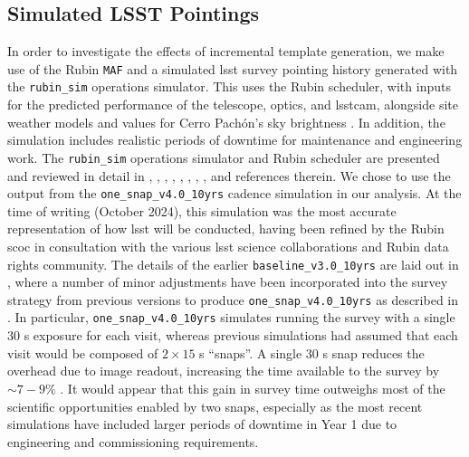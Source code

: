 \documentclass[preprintm,linenumbers]{aastex631}
\newcommand{\baselinefull}{\texttt{one\_snap\_v4.0\_10yrs}\xspace}
\newcommand{\rubinsim}{\texttt{rubin\_sim}\xspace}
\newcommand{\maf}{\texttt{MAF}\xspace}
\begin{document}
	\subsection{Simulated LSST Pointings}
	In order to investigate the effects of incremental template generation, we make use of the Rubin \maf \citep{2014SPIE.9149E..0BJ} and a simulated \gls*{lsst} survey pointing history generated with the \rubinsim operations simulator.
 This uses the Rubin scheduler, with inputs for the predicted performance of the telescope, optics, and \gls*{lsstcam}, alongside site weather models %
 and values for Cerro Pach{\'o}n's sky brightness \citep{Yoachim2016}.
 In addition, the simulation includes realistic periods of downtime for maintenance and engineering work. 
 The \rubinsim operations simulator and Rubin scheduler are presented and reviewed in detail in \cite{2014SPIE.9150E..14C}, \cite{2014SPIE.9150E..15D}, \cite{2016SPIE.9910E..13D}, \cite{Yoachim2016},  \cite{lsstsciencecollaborationScienceDrivenOptimizationLSST2017},  \cite{2018Icar..303..181J}, \cite{2019AJ....157..151N}, \cite{jones_r_lynne_2020_4048838}, \cite{2022ApJS..258....1B} and references therein.  
 We chose to use the output from the \baselinefull cadence simulation \citep{v4.0sims} in our analysis. At the time of writing (October 2024), this simulation was the most accurate representation of how \gls*{lsst} will be conducted, having been refined by the Rubin \gls*{scoc} in consultation with the various \gls*{lsst} science collaborations and Rubin data rights community. 
	The details of the earlier \texttt{baseline\_v3.0\_10yrs} are laid out in \cite{SCOC_Report_2}, where a number of minor adjustments have been incorporated into the survey strategy from previous versions to produce \baselinefull as described in \cite{SCOC_Report_3}. 
    In particular, \baselinefull simulates running the survey with a single $30$ s exposure for each visit, whereas previous simulations had assumed that each visit would be composed of $2 \times 15$ s ``snaps''.
    A single $30$ s snap reduces the overhead due to image readout, increasing the time available to the survey by $\sim 7-9 \%$ \citep[see Section 3.6 of][]{SCOC_Report_3}.
    It would appear that this gain in survey time outweighs most of the scientific opportunities enabled by two snaps, especially as the most recent simulations have included larger periods of downtime in Year 1 due to engineering and commissioning requirements.
	
\end{document}
